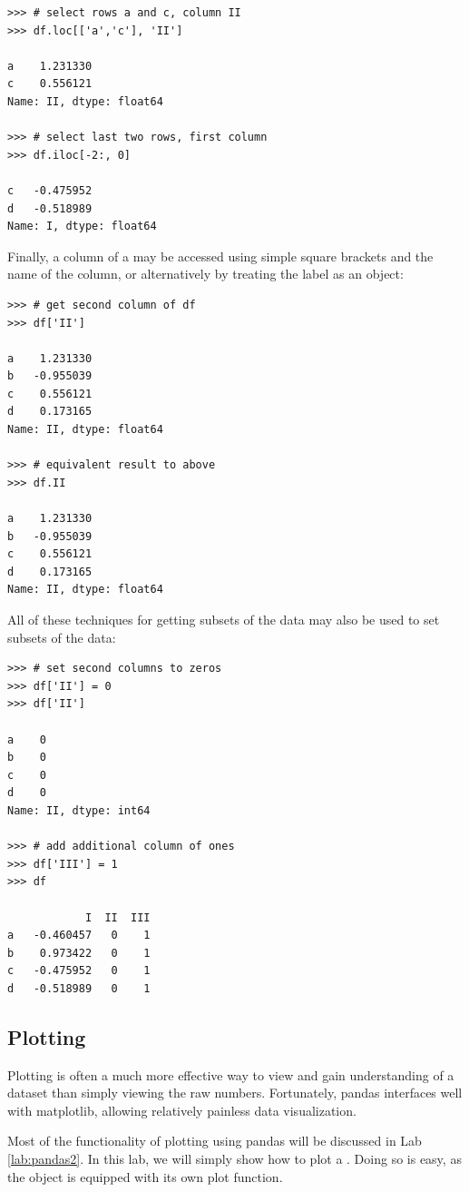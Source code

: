 \begin{lstlisting}
>>> # select rows a and c, column II
>>> df.loc[['a','c'], 'II']

a    1.231330
c    0.556121
Name: II, dtype: float64

>>> # select last two rows, first column
>>> df.iloc[-2:, 0]

c   -0.475952
d   -0.518989
Name: I, dtype: float64
\end{lstlisting}

Finally, a column of a  may be accessed using simple square
brackets and the name of the column, or alternatively by treating the label
as an object:
\begin{lstlisting}
>>> # get second column of df
>>> df['II']

a    1.231330
b   -0.955039
c    0.556121
d    0.173165
Name: II, dtype: float64

>>> # equivalent result to above
>>> df.II

a    1.231330
b   -0.955039
c    0.556121
d    0.173165
Name: II, dtype: float64
\end{lstlisting}

All of these techniques for getting subsets of the data may also be used to set
subsets of the data:
\begin{lstlisting}
>>> # set second columns to zeros
>>> df['II'] = 0
>>> df['II']

a    0
b    0
c    0
d    0
Name: II, dtype: int64

>>> # add additional column of ones
>>> df['III'] = 1
>>> df

            I  II  III
a   -0.460457   0    1
b    0.973422   0    1
c   -0.475952   0    1
d   -0.518989   0    1
\end{lstlisting}


\subsection*{Plotting}
Plotting is often a much more effective way to view and gain understanding of a dataset than simply
viewing the raw numbers. Fortunately, pandas interfaces well with matplotlib, allowing relatively
painless data visualization.

Most of the functionality of plotting using pandas will be discussed in Lab \ref{lab:pandas2}.  In this lab, we will simply show how to plot a . Doing so is easy, as the  object is equipped with its own plot
function.

